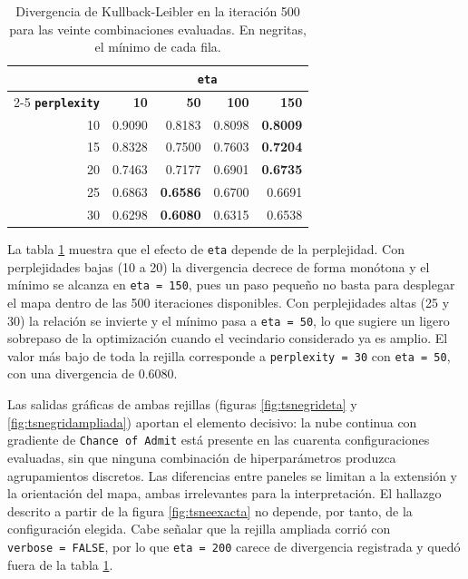 \documentclass[
  10pt,
  a4paper]{article}
\begin{document}
\begin{table}[ht]
  \centering
  \caption{Divergencia de Kullback-Leibler en la iteración 500 para las veinte combinaciones evaluadas. En negritas, el mínimo de cada fila.}
  \begin{tabular}{rrrrr}
    \toprule
    & \multicolumn{4}{c}{\textbf{\texttt{eta}}} \\
    \cmidrule(l){2-5}
    \textbf{\texttt{perplexity}} & \textbf{10} & \textbf{50} & \textbf{100} & \textbf{150} \\
    \midrule
    10 & 0.9090 & 0.8183 & 0.8098 & \textbf{0.8009} \\
    15 & 0.8328 & 0.7500 & 0.7603 & \textbf{0.7204} \\
    20 & 0.7463 & 0.7177 & 0.6901 & \textbf{0.6735} \\
    25 & 0.6863 & \textbf{0.6586} & 0.6700 & 0.6691 \\
    30 & 0.6298 & \textbf{0.6080} & 0.6315 & 0.6538 \\
    \bottomrule
  \end{tabular}
  \label{tab:tsnegrid}
\end{table}

La tabla \ref{tab:tsnegrid} muestra que el efecto de \texttt{eta} depende de la perplejidad. Con perplejidades bajas (10 a 20) la divergencia decrece de forma monótona y el mínimo se alcanza en \texttt{eta\ =\ 150}, pues un paso pequeño no basta para desplegar el mapa dentro de las 500 iteraciones disponibles. Con perplejidades altas (25 y 30) la relación se invierte y el mínimo pasa a \texttt{eta\ =\ 50}, lo que sugiere un ligero sobrepaso de la optimización cuando el vecindario considerado ya es amplio. El valor más bajo de toda la rejilla corresponde a \texttt{perplexity\ =\ 30} con \texttt{eta\ =\ 50}, con una divergencia de 0.6080.

Las salidas gráficas de ambas rejillas (figuras \ref{fig:tsnegrideta} y \ref{fig:tsnegridampliada}) aportan el elemento decisivo: la nube continua con gradiente de \texttt{Chance\ of\ Admit} está presente en las cuarenta configuraciones evaluadas, sin que ninguna combinación de hiperparámetros produzca agrupamientos discretos. Las diferencias entre paneles se limitan a la extensión y la orientación del mapa, ambas irrelevantes para la interpretación. El hallazgo descrito a partir de la figura \ref{fig:tsneexacta} no depende, por tanto, de la configuración elegida. Cabe señalar que la rejilla ampliada corrió con \texttt{verbose\ =\ FALSE}, por lo que \texttt{eta\ =\ 200} carece de divergencia registrada y quedó fuera de la tabla \ref{tab:tsnegrid}.
\end{document}
